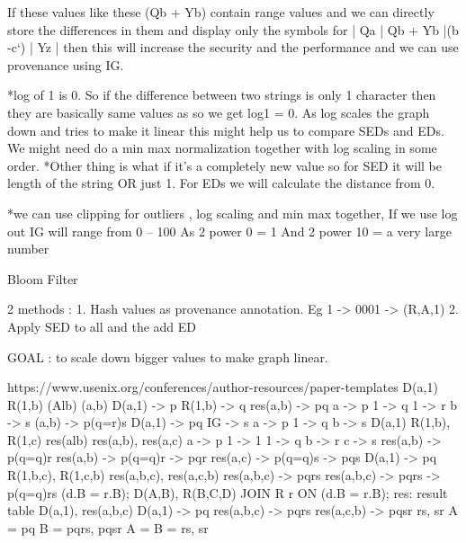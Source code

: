 \documentclass{article}
\begin{document}
If these values like these (Qb + Yb) contain range values and we can directly store the differences in them and display only the symbols for  | Qa | Qb + Yb |(b -c`) | Yz | then this will increase the security and the performance and we can use provenance using IG.

*log of 1 is 0. So if the difference between two strings is only 1 character then they are basically same values as so we get log1 = 0. As log scales the graph down and tries to make it linear this might help us to compare SEDs and EDs. 
We might need do a min max normalization together with log scaling in some order.
*Other thing is what if it’s a completely new value so for SED it will be length of the string OR just 1. For EDs we will calculate the distance from 0.

*we can use clipping for outliers , log scaling and min max together,
If we use log out IG will range from 0 – 100
As 2 power 0 = 1
And 2 power 10 = a very large number

Bloom Filter

2 methods :
1.	Hash values as provenance annotation. Eg 1 -> 0001 -> (R,A,1)
2.	Apply SED to all and the add ED

GOAL : to scale down bigger values to make graph linear.

https://www.usenix.org/conferences/author-resources/paper-templates
D(a,1)
R(1,b)
(Alb)
(a,b)
D(a,1) -> p
R(1,b) -> q
res(a,b) -> pq
a -> p
1 -> q
1 -> r
b -> s
(a,b) -> p(q=r)s
D(a,1) -> pq
IG -> s
a -> p
1 -> q
b -> s
D(a,1)
R(1,b), R(1,c)
res(alb)
res(a,b), res(a,c)
a -> p
1 -> 1
1 -> q
b -> r
c -> s
res(a,b) -> p(q=q)r
res(a,b) -> p(q=q)r -> pqr
res(a,c) -> p(q=q)s -> pqs
D(a,1) -> pq
R(1,b,c), R(1,c,b)
res(a,b,c), res(a,c,b)
res(a,b,c) -> pqrs
res(a,b,c) -> pqrs -> p(q=q)rs
(d.B = r.B);
D(A,B), R(B,C,D)
JOIN R r ON (d.B = r.B);
res: result table
D(a,1), res(a,b,c)
D(a,1) -> pq
res(a,b,c) -> pqrs
res(a,c,b) -> pqsr
{rs, sr}
{}
A = {pq}
B = {pqrs, pqsr}
A = {}
B = {rs, sr}
\end{document}
